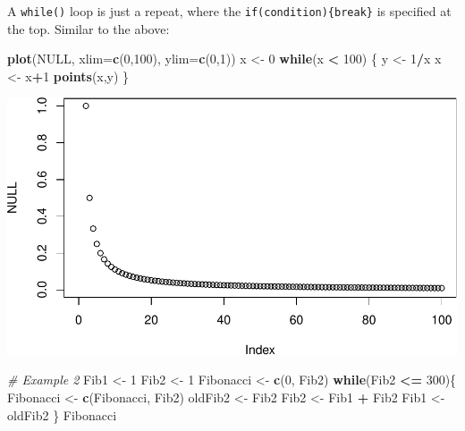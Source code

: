 \documentclass[]{article}
\newenvironment{Shaded}{\begin{snugshade}}{\end{snugshade}}
\newcommand{\KeywordTok}[1]{\textcolor[rgb]{0.13,0.29,0.53}{\textbf{#1}}}
\newcommand{\DataTypeTok}[1]{\textcolor[rgb]{0.13,0.29,0.53}{#1}}
\newcommand{\DecValTok}[1]{\textcolor[rgb]{0.00,0.00,0.81}{#1}}
\newcommand{\StringTok}[1]{\textcolor[rgb]{0.31,0.60,0.02}{#1}}
\newcommand{\CommentTok}[1]{\textcolor[rgb]{0.56,0.35,0.01}{\textit{#1}}}
\newcommand{\OtherTok}[1]{\textcolor[rgb]{0.56,0.35,0.01}{#1}}
\newcommand{\ControlFlowTok}[1]{\textcolor[rgb]{0.13,0.29,0.53}{\textbf{#1}}}
\newcommand{\OperatorTok}[1]{\textcolor[rgb]{0.81,0.36,0.00}{\textbf{#1}}}
\newcommand{\NormalTok}[1]{#1}
\begin{document}
A \texttt{while()} loop is just a repeat, where the
\texttt{if(condition)\{break\}} is specified at the top. Similar to the
above:

\begin{Shaded}
\begin{Highlighting}[]
\KeywordTok{plot}\NormalTok{(}\OtherTok{NULL}\NormalTok{, }\DataTypeTok{xlim=}\KeywordTok{c}\NormalTok{(}\DecValTok{0}\NormalTok{,}\DecValTok{100}\NormalTok{), }\DataTypeTok{ylim=}\KeywordTok{c}\NormalTok{(}\DecValTok{0}\NormalTok{,}\DecValTok{1}\NormalTok{))}
\NormalTok{x <-}\StringTok{ }\DecValTok{0}
\ControlFlowTok{while}\NormalTok{(x }\OperatorTok{<}\StringTok{ }\DecValTok{100}\NormalTok{) \{}
\NormalTok{  y <-}\StringTok{ }\DecValTok{1}\OperatorTok{/}\NormalTok{x}
\NormalTok{  x <-}\StringTok{ }\NormalTok{x}\OperatorTok{+}\DecValTok{1}
  \KeywordTok{points}\NormalTok{(x,y)}
\NormalTok{\}}
\end{Highlighting}
\end{Shaded}

\includegraphics{Lab4_Matrix_Algebra_Functions_files/figure-latex/while1-1.pdf}

\begin{Shaded}
\begin{Highlighting}[]
\CommentTok{# Example 2}
\NormalTok{Fib1 <-}\StringTok{ }\DecValTok{1}
\NormalTok{Fib2 <-}\StringTok{ }\DecValTok{1}
\NormalTok{Fibonacci <-}\StringTok{ }\KeywordTok{c}\NormalTok{(}\DecValTok{0}\NormalTok{, Fib2)}
\ControlFlowTok{while}\NormalTok{(Fib2 }\OperatorTok{<=}\StringTok{ }\DecValTok{300}\NormalTok{)\{}
\NormalTok{  Fibonacci <-}\StringTok{ }\KeywordTok{c}\NormalTok{(Fibonacci, Fib2)}
\NormalTok{  oldFib2 <-}\StringTok{ }\NormalTok{Fib2}
\NormalTok{  Fib2 <-}\StringTok{ }\NormalTok{Fib1 }\OperatorTok{+}\StringTok{ }\NormalTok{Fib2}
\NormalTok{  Fib1 <-}\StringTok{ }\NormalTok{oldFib2}
\NormalTok{\}}
\NormalTok{Fibonacci}
\end{Highlighting}
\end{Shaded}
\end{document}
